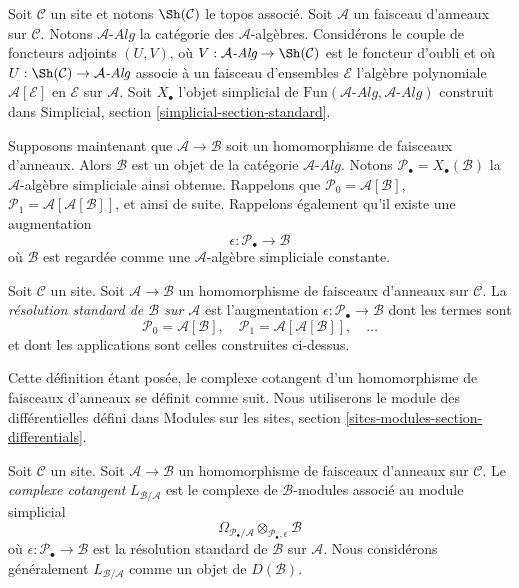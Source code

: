 \medskip\noindent
Soit $\mathcal{C}$ un site et notons $\Sh(\mathcal{C})$ le topos associé. Soit
$\mathcal{A}$ un faisceau d'anneaux sur $\mathcal{C}$. Notons
$\mathcal{A}\textit{-Alg}$ la catégorie des $\mathcal{A}$-algèbres.
Considérons le couple de foncteurs adjoints $(U, V)$, où
$V : \mathcal{A}\textit{-Alg} \to \Sh(\mathcal{C})$ est le foncteur d'oubli et
où $U : \Sh(\mathcal{C}) \to \mathcal{A}\textit{-Alg}$ associe à un faisceau
d'ensembles $\mathcal{E}$ l'algèbre polynomiale
$\mathcal{A}[\mathcal{E}]$ en $\mathcal{E}$ sur $\mathcal{A}$. Soit
$X_\bullet$ l'objet simplicial de
$\text{Fun}(\mathcal{A}\textit{-Alg}, \mathcal{A}\textit{-Alg})$ construit dans
Simplicial, section \ref{simplicial-section-standard}.

\medskip\noindent
Supposons maintenant que $\mathcal{A} \to \mathcal{B}$ soit un homomorphisme
de faisceaux d'anneaux. Alors $\mathcal{B}$ est un objet de la catégorie
$\mathcal{A}\textit{-Alg}$. Notons
$\mathcal{P}_\bullet = X_\bullet(\mathcal{B})$ la $\mathcal{A}$-algèbre
simpliciale ainsi obtenue. Rappelons que
$\mathcal{P}_0 = \mathcal{A}[\mathcal{B}]$,
$\mathcal{P}_1 = \mathcal{A}[\mathcal{A}[\mathcal{B}]]$, et ainsi de suite.
Rappelons également qu'il existe une augmentation
$$
\epsilon : \mathcal{P}_\bullet \longrightarrow \mathcal{B}
$$
où $\mathcal{B}$ est regardée comme une $\mathcal{A}$-algèbre simpliciale
constante.

\begin{definition}
\label{definition-standard-resolution-sheaves-rings}
Soit $\mathcal{C}$ un site. Soit $\mathcal{A} \to \mathcal{B}$ un
homomorphisme de faisceaux d'anneaux sur $\mathcal{C}$. La {\it résolution
standard de $\mathcal{B}$ sur $\mathcal{A}$} est l'augmentation
$\epsilon : \mathcal{P}_\bullet \to \mathcal{B}$
dont les termes sont
$$
\mathcal{P}_0 = \mathcal{A}[\mathcal{B}],\quad
\mathcal{P}_1 = \mathcal{A}[\mathcal{A}[\mathcal{B}]],\quad \ldots
$$
et dont les applications sont celles construites ci-dessus.
\end{definition}

\noindent
Cette définition étant posée, le complexe cotangent d'un homomorphisme de
faisceaux d'anneaux se définit comme suit. Nous utiliserons le module des
différentielles défini dans Modules sur les sites, section
\ref{sites-modules-section-differentials}.

\begin{definition}
\label{definition-cotangent-complex-morphism-sheaves-rings}
Soit $\mathcal{C}$ un site. Soit $\mathcal{A} \to \mathcal{B}$ un
homomorphisme de faisceaux d'anneaux sur $\mathcal{C}$. Le {\it complexe
cotangent} $L_{\mathcal{B}/\mathcal{A}}$ est le complexe de
$\mathcal{B}$-modules associé au module simplicial
$$
\Omega_{\mathcal{P}_\bullet/\mathcal{A}}
\otimes_{\mathcal{P}_\bullet, \epsilon} \mathcal{B}
$$
où $\epsilon : \mathcal{P}_\bullet \to \mathcal{B}$ est la résolution standard
de $\mathcal{B}$ sur $\mathcal{A}$. Nous considérons généralement
$L_{\mathcal{B}/\mathcal{A}}$ comme un objet de $D(\mathcal{B})$.
\end{definition}

